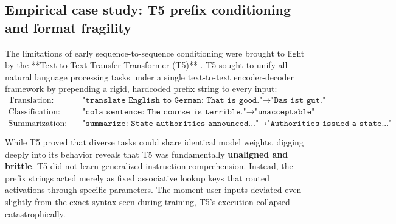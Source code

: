 \documentclass[../../main.tex]{subfiles}
\begin{document}
\subsection{Empirical case study: T5 prefix conditioning and format fragility}
\label{subsec:t5_empirical_brittleness}

The limitations of early sequence-to-sequence conditioning were brought to light by the **Text-to-Text Transfer Transformer (T5)** \citep{raffel2020t5}. T5 sought to unify all natural language processing tasks under a single text-to-text encoder-decoder framework by prepending a rigid, hardcoded prefix string to every input:
\begin{align*}
\text{Translation:} & \quad \texttt{"translate English to German: That is good."} \longrightarrow \texttt{"Das ist gut."} \\
\text{Classification:} & \quad \texttt{"cola sentence: The course is terrible."} \longrightarrow \texttt{"unacceptable"} \\
\text{Summarization:} & \quad \texttt{"summarize: State authorities announced..."} \longrightarrow \texttt{"Authorities issued a state..."}
\end{align*}

While T5 proved that diverse tasks could share identical model weights, digging deeply into its behavior reveals that T5 was fundamentally \textbf{unaligned and brittle}. T5 did not learn generalized instruction comprehension. Instead, the prefix strings acted merely as fixed associative lookup keys that routed activations through specific parameters. The moment user inputs deviated even slightly from the exact syntax seen during training, T5's execution collapsed catastrophically.
\end{document}
